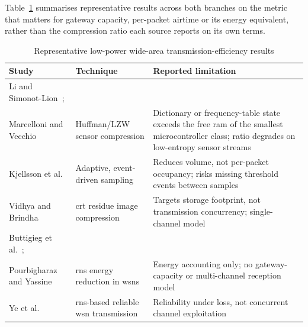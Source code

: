 Table~\ref{tab:lit-lpwan-comparison} summarises representative results
across both branches on the metric that matters for gateway capacity,
per-packet airtime or its energy equivalent, rather than the compression
ratio each source reports on its own terms.

\begin{table}[htbp]
\centering
\caption{Representative low-power wide-area transmission-efficiency results}
\label{tab:lit-lpwan-comparison}
\footnotesize
\begin{tabularx}{\textwidth}{@{}p{}p{}X@{}}
\toprule
\textbf{Study} & \textbf{Technique} & \textbf{Reported limitation} \\
\midrule
Li and Simonot-Lion~\cite{li2018lossless};\\ Marcelloni and Vecchio~\cite{marcelloni2009energy}
  & Huffman/LZW sensor compression
  & Dictionary or frequency-table state exceeds the free \gls{ram} of the
    smallest microcontroller class; ratio degrades on low-entropy sensor
    streams \\
\midrule
Kjellsson et al.~\cite{kjellsson2008adaptive}
  & Adaptive, event-driven sampling
  & Reduces volume, not per-packet occupancy; risks missing threshold
    events between samples \\
\midrule
Vidhya and Brindha~\cite{vidhya2021crt}
  & \gls{crt} residue image compression
  & Targets storage footprint, not transmission concurrency; single-channel
    model \\
\midrule
Buttigieg et al.~\cite{khan2023fuzzycrt};\\ Pourbigharaz and Yassine~\cite{rahman2022rnsenergy}
  & \gls{rns} energy reduction in \glspl{wsn}
  & Energy accounting only; no gateway-capacity or multi-channel reception
    model \\
\midrule
Ye et al.~\cite{djeddi2025parallelCRT}
  & \gls{rns}-based reliable \gls{wsn} transmission
  & Reliability under loss, not concurrent channel exploitation \\
\bottomrule
\end{tabularx}
\end{table}

\label{subsec:lit_crt}

